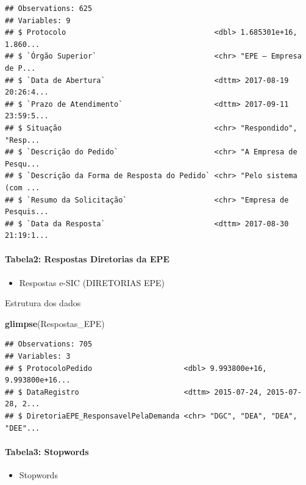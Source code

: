 \documentclass[]{article}
\newenvironment{Shaded}{\begin{snugshade}}{\end{snugshade}}
\newcommand{\KeywordTok}[1]{\textcolor[rgb]{0.13,0.29,0.53}{\textbf{#1}}}
\newcommand{\NormalTok}[1]{#1}
\providecommand{\tightlist}{%
  \setlength{\itemsep}{0pt}\setlength{\parskip}{0pt}}
\let\oldparagraph\paragraph
\renewcommand{\paragraph}[1]{\oldparagraph{#1}\mbox{}}
\begin{document}
\begin{verbatim}
## Observations: 625
## Variables: 9
## $ Protocolo                                  <dbl> 1.685301e+16, 1.860...
## $ `Órgão Superior`                           <chr> "EPE – Empresa de P...
## $ `Data de Abertura`                         <dttm> 2017-08-19 20:26:4...
## $ `Prazo de Atendimento`                     <dttm> 2017-09-11 23:59:5...
## $ Situação                                   <chr> "Respondido", "Resp...
## $ `Descrição do Pedido`                      <chr> "A Empresa de Pesqu...
## $ `Descrição da Forma de Resposta do Pedido` <chr> "Pelo sistema (com ...
## $ `Resumo da Solicitação`                    <chr> "Empresa de Pesquis...
## $ `Data da Resposta`                         <dttm> 2017-08-30 21:19:1...
\end{verbatim}

\paragraph{Tabela2: Respostas Diretorias da
EPE}\label{tabela2-respostas-diretorias-da-epe}

\begin{itemize}
\tightlist
\item
  Respostas e-SIC (DIRETORIAS EPE)
\end{itemize}

Estrutura dos dados

\begin{Shaded}
\begin{Highlighting}[]
\KeywordTok{glimpse}\NormalTok{(Respostas_EPE)}
\end{Highlighting}
\end{Shaded}

\begin{verbatim}
## Observations: 705
## Variables: 3
## $ ProtocoloPedido                     <dbl> 9.993800e+16, 9.993800e+16...
## $ DataRegistro                        <dttm> 2015-07-24, 2015-07-28, 2...
## $ DiretoriaEPE_ResponsavelPelaDemanda <chr> "DGC", "DEA", "DEA", "DEE"...
\end{verbatim}

\paragraph{Tabela3: Stopwords}\label{tabela3-stopwords}

\begin{itemize}
\tightlist
\item
  Stopwords
\end{itemize}
\end{document}
